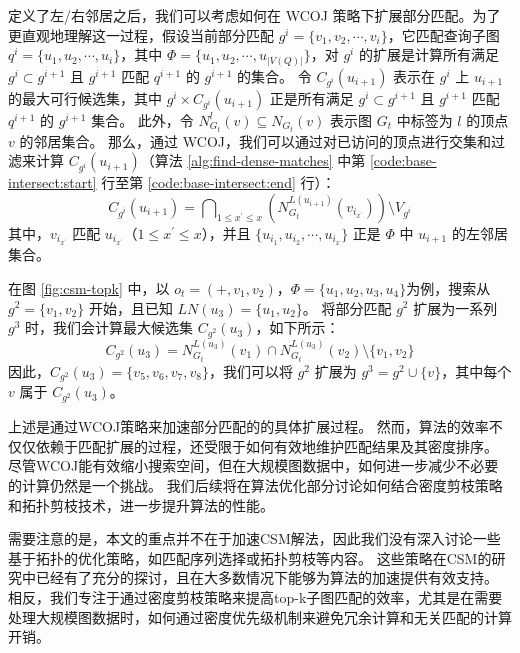 定义了左/右邻居之后，我们可以考虑如何在 WCOJ 策略下扩展部分匹配。为了更直观地理解这一过程，假设当前部分匹配 $g^i = \{v_1, v_2, \cdots, v_i\}$，它匹配查询子图 $q^i = \{u_1, u_2, \cdots, u_i\}$，其中 $\Phi = \{u_1, u_2, \cdots, u_{|V(Q)|}\}$，对 $g^i$ 的扩展是计算所有满足 $g^i \subset g^{i+1}$ 且 $g^{i+1}$ 匹配 $q^{i+1}$ 的 $g^{i+1}$ 的集合。
令 $C_{g^{i}}(u_{i+1})$ 表示在 $g^i$ 上 $u_{i+1}$ 的最大可行候选集，其中 $g^i \times C_{g^{i}}(u_{i+1})$ 正是所有满足 $g^i \subset g^{i+1}$ 且 $g^{i+1}$ 匹配 $q^{i+1}$ 的 $g^{i+1}$ 集合。
此外，令 $N_{G_t}^l(v) \subseteq N_{G_t}(v)$ 表示图 $G_t$ 中标签为 $l$ 的顶点 $v$ 的邻居集合。
那么，通过 WCOJ，我们可以通过对已访问的顶点进行交集和过滤来计算 $C_{g^{i}}(u_{i+1})$（算法 \ref{alg:find-dense-matches} 中第 \ref{code:base-intersect:start} 行至第 \ref{code:base-intersect:end} 行）：
\begin{equation} \label{equation:wcoj-intersection}
    C_{g^{i}}(u_{i+1}) = \bigcap\nolimits_{1\leq x^\prime\leq x} \left(  N_{G_t}^{L(u_{i+1})}(v_{i_{x^\prime}}) \right)  \setminus V_{g^i}
\end{equation}
其中，$v_{i_{x^\prime}}$ 匹配 $u_{i_{x^\prime}}$（$1 \leq x^\prime \leq x$），并且 $\{u_{i_1}, u_{i_2}, \cdots, u_{i_x}\}$ 正是 $\Phi$ 中 $u_{i+1}$ 的左邻居集合。

在图 \ref{fig:csm-topk} 中，以 $o_t = (+,v_1,v_2)$，$\Phi = \{u_1,u_2,u_3,u_4\}$为例，搜索从 $g^2 = \{v_1,v_2\}$ 开始，且已知 $LN(u_3) = \{u_1, u_2\}$。
将部分匹配 $g^2$ 扩展为一系列 $g^3$ 时，我们会计算最大候选集 $C_{g^{2}}(u_3)$，如下所示：
\begin{equation}\label{equation:wcoj-example}
	C_{g^{2}}(u_{3}) =  N_{G_t}^{L(u_{3})}(v_{1})\cap N_{G_t}^{L(u_{3})}(v_{2})  \setminus \{v_1, v_2\}
\end{equation}
因此，$C_{g^{2}}(u_3) = \{v_5, v_6, v_7, v_8\}$，我们可以将 $g^2$ 扩展为 $g^3 = g^2 \cup \{v\}$，其中每个 $v$ 属于 $C_{g^{2}}(u_3)$。

上述是通过WCOJ策略来加速部分匹配的的具体扩展过程。
然而，算法的效率不仅仅依赖于匹配扩展的过程，还受限于如何有效地维护匹配结果及其密度排序。
尽管WCOJ能有效缩小搜索空间，但在大规模图数据中，如何进一步减少不必要的计算仍然是一个挑战。
我们后续将在算法优化部分讨论如何结合密度剪枝策略和拓扑剪枝技术，进一步提升算法的性能。

需要注意的是，本文的重点并不在于加速CSM解法，因此我们没有深入讨论一些基于拓扑的优化策略，如匹配序列选择或拓扑剪枝等内容。
这些策略在CSM的研究中已经有了充分的探讨，且在大多数情况下能够为算法的加速提供有效支持。
相反，我们专注于通过密度剪枝策略来提高top-k子图匹配的效率，尤其是在需要处理大规模图数据时，如何通过密度优先级机制来避免冗余计算和无关匹配的计算开销。



